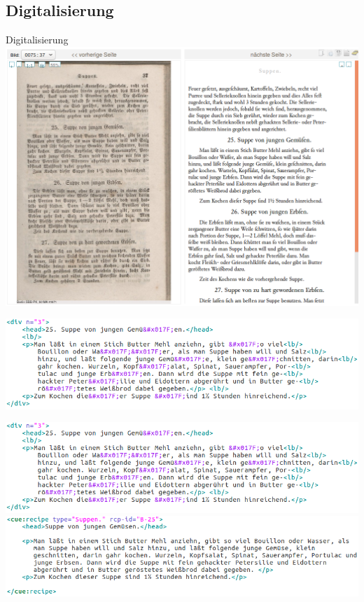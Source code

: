 \documentclass[12pt]{beamer}
\newcommand{\myCite}[1]{{\scriptsize\parencite{#1}}}
\begin{document}
\subsection{Digitalisierung}
\begin{frame}{Digitalisierung}
	\myCite{DTA} \\
	\includegraphics[scale=0.3]{Images/BeispielSeite}
\end{frame}

\begin{frame}
	\includegraphics[scale=0.4]{Images/derenXML} \\
\end{frame}

\begin{frame}
	\includegraphics[scale=0.4]{Images/derenXML} \\
	\vspace{0.3cm}
	\hrulefill
	\vspace{0.3cm}
	\includegraphics[scale=0.4]{Images/unserXML}
\end{frame}
\end{document}
